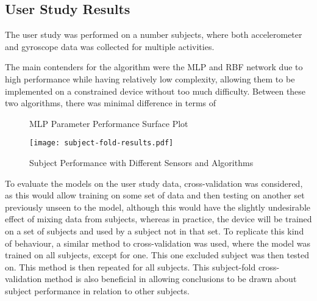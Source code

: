 \subsection{User Study Results}
The user study was performed on a number  subjects, where both accelerometer and gyroscope data was collected for multiple activities.

The main contenders for the algorithm were the MLP and RBF network due to high performance while having relatively low complexity, allowing them to be implemented on a constrained device without too much difficulty. Between these two algorithms, there was minimal difference in terms of 

\begin{figure}
	\centering
	\caption{MLP Parameter Performance Surface Plot \label{fig:mlp-multi}}
\end{figure}

\begin{figure}
	\texttt{[image: subject-fold-results.pdf]}
	\caption{Subject Performance with Different Sensors and Algorithms \label{fig:subfold}}
\end{figure}

To evaluate the models on the user study data, cross-validation was considered, as this would allow training on some set of data and then testing on another set previously unseen to the model, although this would have the slightly undesirable effect of mixing data from subjects, whereas in practice, the device will be trained on a set of subjects and used by a subject not in that set. To replicate this kind of behaviour, a similar method to cross-validation was used, where the model was trained on all subjects, except for one. This one excluded subject was then tested on. This method is then repeated for all subjects. This subject-fold cross-validation method is also beneficial in allowing conclusions to be drawn about subject performance in relation to other subjects.

